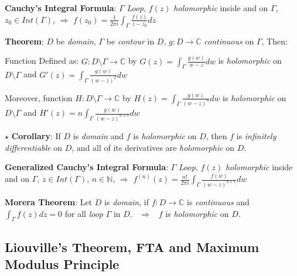 \documentclass[9pt]{article}
\begin{document}
\textbf{Cauchy's Integral Formula}: $\Gamma$ \textit{Loop}, $f(z)$ \textit{holomorphic} inside and on $\Gamma$, $z_0\in Int(\Gamma)$, \quad $\Rightarrow$ \quad $f(z_0)=\frac{1}{2\pi i}\int_{\Gamma}\frac{f(z)}{z-z_0}dz$


\textbf{Theorem}: $D$ be \textit{domain}, $\Gamma$ be \textit{contour} in $D$, $g:D\to\mathbb{C}$ \textit{continuous} on $\Gamma$, Then:

\hspace{46pt} Function Defined as: $G:D\setminus\Gamma\to\mathbb{C}$ by \quad $G(z)=\int_{\Gamma}\frac{g(w)}{w-z}dw$ is \textit{holomorphic} on $D\setminus\Gamma$ \quad and \quad $G'(z)=\int_{\Gamma}\frac{g(w)}{(w-z)^2}dw$

\hspace{46pt} Moreover, function $H:D\setminus\Gamma\to\mathbb{C}$ by \quad $H(z)=\int_{\Gamma}\frac{g(w)}{(w-z)^n}dw$ is \textit{holomorphic} on $D\setminus\Gamma$ \quad and \quad $H'(z)=n\int_{\Gamma}\frac{g(w)}{(w-z)^{n+1}}dw$

\quad $\star$   \textbf{Corollary}: {\small If $D$ is \textit{domain} and $f$ is \textit{holomorphic} on $D$, then $f$ is \textit{infinitely differentiable} on $D$, and all of its derivatives are \textit{holomorphic} on $D$.}

\textbf{Generalized Cauchy's Integral Formula}: {\footnotesize $\Gamma$ \textit{Loop}, $f(z)$ \textit{holomorphic} inside and on $\Gamma$, $z\in Int(\Gamma)$, $n\in\mathbb{N}$,} \quad $\Rightarrow$ \quad $f^{(n)}(z)=\frac{n!}{2\pi i}\int_{\Gamma}\frac{f(w)}{(w-z)^{n+1}}dw$


\textbf{Morera Theorem}: Let $D$ is \textit{domain}, if $f:D\to\mathbb{C}$ is \textit{continuous} and $\int_{\Gamma}f(z)dz=0$ for all \textit{loop} $\Gamma$ in $D$. \ $\Rightarrow$ \ $f$ is \textit{holomorphic} on $D$.


\subsection{Liouville's Theorem, FTA and Maximum Modulus Principle} %
\end{document}
